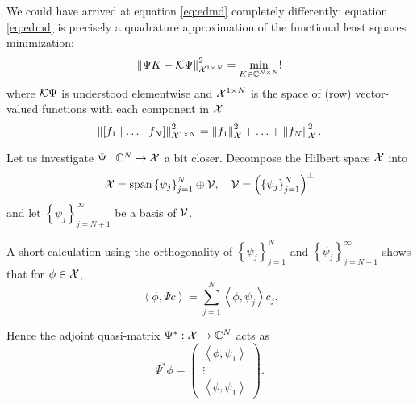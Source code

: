 We could have arrived at equation \ref{eq:edmd} completely differently: 
equation \ref{eq:edmd} is precisely a quadrature approximation of the functional least 
squares minimization:
\begin{equation}
    \label{eq:edmd_functional}
    \left\| \Psi K - \mathcal{K} \Psi \right\|_{\mathcal{X}^{1 \times N}}^2 
    = \min_{K \in \mathbb{C}^{N \times N}} !
\end{equation}
where $\mathcal{K} \Psi$ is understood elementwise and
$\mathcal{X}^{1 \times N}$ is the space of (row) vector-valued functions with each 
component in $\mathcal{X}$
\begin{equation}
    \left\| \left[ f_1 \mid \ldots \mid f_N \right] \right\|_{\mathcal{X}^{1 \times N}}^2
    = \left\| f_1 \right\|_{\mathcal{X}}^2 + \ldots + \left\| f_N \right\|_{\mathcal{X}}^2 . 
\end{equation}

Let us investigate $\Psi : \mathbb{C}^N \to \mathcal{X}$ a bit closer. Decompose the Hilbert space 
$\mathcal{X}$ into 
\begin{equation}
    \mathcal{X} = \text{span} \left\{ \psi_j \right\}_{j=1}^N \oplus \mathcal{V}, \quad 
    \mathcal{V} = \left( \left\{ \psi_j \right\}_{j=1}^N \right)^\perp
\end{equation}
and let $\left\{ \psi_j \right\}_{j=N+1}^\infty$ be a basis of $\mathcal{V}$. 

A short calculation using the orthogonality of $\left\{ \psi_j \right\}_{j=1}^N$ and 
$\left\{ \psi_j \right\}_{j=N+1}^\infty$ shows that for $\phi \in \mathcal{X}$, 
\begin{equation}
    \left\langle \phi, \Psi c \right\rangle 
    = \sum_{j=1}^{N} \left\langle \phi, \psi_j \right\rangle c_j . 
\end{equation}
\iffalse
Let $\phi = \sum_{i=1}^{\infty} b_i \psi_i$ and observe
\begin{align}
    \left\langle \phi, \Psi c \right\rangle
    &= \sum_{i=1}^{\infty} \sum_{j=1}^{N} b_i c_j \left\langle \psi_i, \psi_j \right\rangle \\
    &= \sum_{i=1}^{N} \sum_{j=1}^{N} b_i c_j \left\langle \psi_i, \psi_j \right\rangle \\
    &= \sum_{j=1}^{N} \left\langle \sum_{i=1}^{N} b_i \psi_i, \psi_j \right\rangle c_j \\
    &= \sum_{j=1}^{N} \left\langle \sum_{i=1}^{\infty} b_i \psi_i, \psi_j \right\rangle c_j \\
    &= \sum_{j=1}^{N} \left\langle \phi, \psi_j \right\rangle c_j . 
\end{align}
\fi
Hence the adjoint quasi-matrix $\Psi^* : \mathcal{X} \to \mathbb{C}^N$ acts as 
\begin{equation}
    \label{eq:Psi_star}
    \Psi^* \phi = \begin{pmatrix}
        \left\langle \phi, \psi_1 \right\rangle \\
        \vdots \\
        \left\langle \phi, \psi_1 \right\rangle
    \end{pmatrix} . 
\end{equation}

